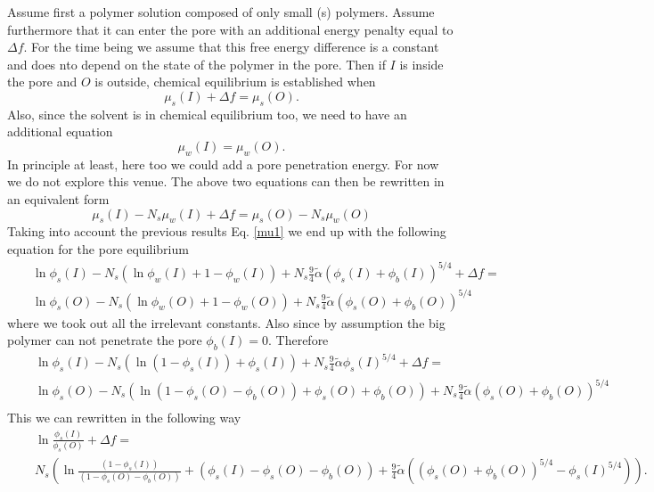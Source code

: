 \documentclass[11pt,a4paper]{article}
\begin{document}
Assume first a polymer solution composed of only small (s) polymers. Assume furthermore that it can enter the pore with an additional energy penalty equal to $\Delta f$. For the time being we assume that this free energy difference is a constant and does nto depend on the state of the polymer in the pore. Then if $I$ is inside the pore and $O$ is outside, chemical equilibrium is established when 
\begin{equation}
\mu_s (I) + \Delta f = \mu_s(O).
\label{grapel1}
\end{equation}
Also, since the solvent is in chemical equilibrium too, we need to have an additional equation
\begin{equation}
\mu_w (I) = \mu_w(O).
\end{equation}
In principle at least, here too we could add a pore penetration energy. For now we do not explore this venue. The above two equations can then be rewritten in an equivalent form
\begin{equation}
\mu_{s}(I) - N_s \mu_w(I) + \Delta f = \mu_{s}(O) - N_s \mu_w(O) 
\end{equation}
Taking into account the previous results Eq. \ref{mu1} we end up with the following equation for the pore equilibrium
\begin{eqnarray}
& & \ln{\phi_{s}(I)} - N_s (\ln{\phi_w(I)} +1 - \phi_w(I)) + N_s \frac{9}{4} \tilde\alpha \left( \phi_s(I) + \phi_b(I)\right)^{5/4} + \Delta f = \nonumber\\
&& \ln{\phi_{s}(O)} - N_s (\ln{\phi_w(O)} +1 - \phi_w(O)) + N_s \frac{9}{4} \tilde\alpha \left( \phi_s(O) + \phi_b(O)\right)^{5/4}
\end{eqnarray}
where we took out all the irrelevant constants. Also since by assumption the big polymer can not penetrate the pore $ \phi_b(I) = 0$. Therefore
\begin{eqnarray}
& & \ln{\phi_{s}(I)} - N_s (\ln{(1-\phi_{s}(I))} +\phi_{s}(I)) + N_s \frac{9}{4} \tilde\alpha \phi_s(I)^{5/4} + \Delta f = \nonumber\\
&& \ln{\phi_{s}(O)} - N_s (\ln{(1 - \phi_s(O) - \phi_b(O))} + \phi_s(O) + \phi_b(O)) + N_s \frac{9}{4} \tilde\alpha \left( \phi_s(O) + \phi_b(O)\right)^{5/4}\nonumber\\
~
\end{eqnarray}
This we can rewritten in the following way
\begin{eqnarray}
& & \ln\frac{\phi_{s}(I)}{\phi_{s}(O)} + \Delta f  = \nonumber\\
& & N_s \left( \ln\frac{(1 - \phi_s(I))}{(1 - \phi_s(O) - \phi_b(O))} + (\phi_{s}(I) - \phi_s(O) - \phi_b(O))+ \frac{9}{4} \tilde\alpha \left( \left( \phi_s(O) + \phi_b(O)\right)^{5/4} - \phi_s(I)^{5/4}\right)\right). \nonumber\\
~
\end{eqnarray}
\end{document}
